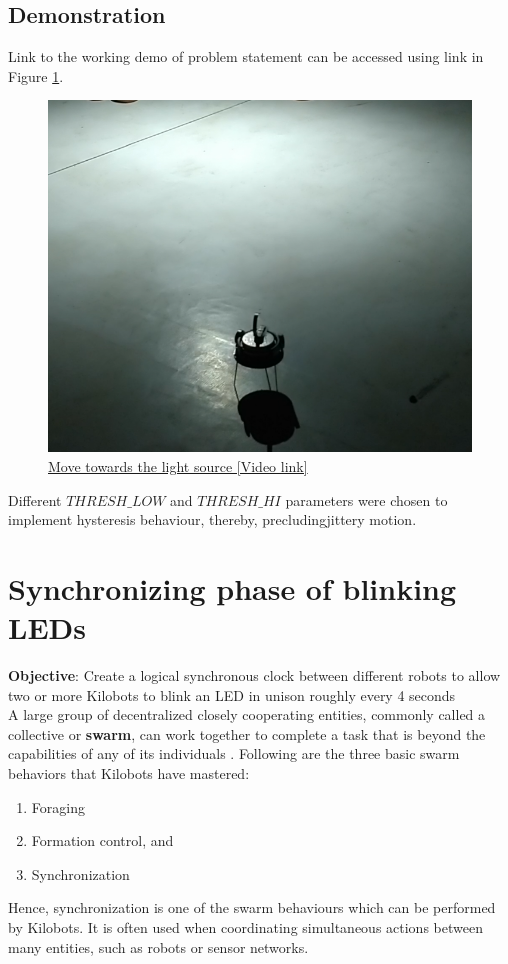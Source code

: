 \documentclass{report}[12pt]
\begin{document}
\subsection{Demonstration}
Link to the working demo of problem statement can be accessed using link in Figure \ref{fig:move_towards_the_light}.
\begin{figure}[H]
	\centering
	\includegraphics[scale=0.4]{images/move_towards_light}
	\caption{\href{https://www.google.com/url?sa=j&url=https\%3A\%2F\%2Fphotos.app.goo.gl\%2FnUNghDg4nJygpzUu5&uct=1551610784&usg=G0tZGJ7iMN79F5qGk1QMw5rfodM.}{Move towards the light source [Video link]}}
	\label{fig:move_towards_the_light}
\end{figure}
Different $THRESH\_LOW$ and $THRESH\_HI$ parameters were chosen to implement hysteresis behaviour, thereby, precludingjittery motion.


\section{Synchronizing phase of blinking LEDs}
\textbf{Objective}: Create a logical synchronous clock between different 
robots to allow two or more Kilobots to blink an LED in unison roughly every 4 seconds \\

\noindent A large group of decentralized closely cooperating entities, commonly called a collective or \textbf{swarm}, can work together to complete a task that is beyond the capabilities of any of its individuals \cite{rubenstein2014kilobot}. Following are the three basic swarm behaviors that Kilobots have mastered: 
\begin{enumerate}
	\item  Foraging
	\item  Formation control, and 
	\item Synchronization
\end{enumerate}
Hence, synchronization is one of the swarm behaviours which can be performed by Kilobots. It is often used when coordinating simultaneous
actions between many entities, such as robots or sensor networks.\\
\end{document}
